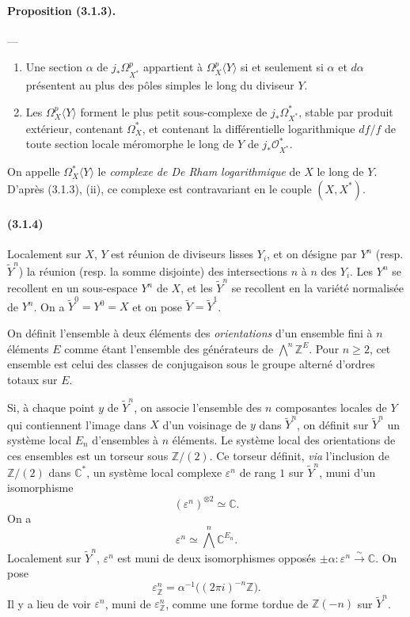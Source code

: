 \documentclass[10pt]{article}
\newcommand{\C}{\mathbb C}
\newcommand{\Z}{\mathbb Z}
\newcommand{\iso}{\xrightarrow{\sim}}
\providecommand{\cO}{\mathcal O}
\providecommand{\cO}{\mathcal O}
\begin{document}
\paragraph{Proposition (3.1.3).} --- {\itshape
\begin{enumerate}[label=(\roman*)]
\item Une section $\alpha$ de $j_*\Omega_{X^*}^p$ appartient à $\Omega_X^p\langle Y\rangle$ si et seulement si $\alpha$ et $d\alpha$ présentent au plus des pôles simples le long du diviseur $Y$.
\item Les $\Omega_X^p\langle Y\rangle$ forment le plus petit sous-complexe de $j_*\Omega_{X^*}^*$, stable par produit extérieur, contenant $\Omega_X^*$, et contenant la différentielle logarithmique $df/f$ de toute section locale méromorphe le long de $Y$ de $j_*\cO_{X^*}^*$.
\end{enumerate}}
On appelle $\Omega_X^*\langle Y\rangle$ le \emph{complexe de De Rham logarithmique} de $X$ le long de $Y$. D'après (3.1.3), (ii), ce complexe est contravariant en le couple $(X,X^*)$.

\paragraph{(3.1.4)} Localement sur $X$, $Y$ est réunion de diviseurs lisses $Y_i$, et on désigne par $Y^n$ (resp. $\widetilde Y^n$) la réunion (resp. la somme disjointe) des intersections $n$ à $n$ des $Y_i$. Les $Y^n$ se recollent en un sous-espace $Y^n$ de $X$, et les $\widetilde Y^n$ se recollent en la variété normalisée de $Y^n$. On a $\widetilde Y^0=Y^0=X$ et on pose $\widetilde Y=\widetilde Y^1$.

On définit l'ensemble à deux éléments des \emph{orientations} d'un ensemble fini à $n$ éléments $E$ comme étant l'ensemble des générateurs de $\bigwedge^n\Z^E$. Pour $n\ge2$, cet ensemble est celui des classes de conjugaison sous le groupe alterné d'ordres totaux sur $E$.

Si, à chaque point $y$ de $\widetilde Y^n$, on associe l'ensemble des $n$ composantes locales de $Y$ qui contiennent l'image dans $X$ d'un voisinage de $y$ dans $\widetilde Y^n$, on définit sur $\widetilde Y^n$ un système local $E_n$ d'ensembles à $n$ éléments. Le système local des orientations de ces ensembles est un torseur sous $\Z/(2)$. Ce torseur définit, \emph{via} l'inclusion de $\Z/(2)$ dans $\C^*$, un système local complexe $\varepsilon^n$ de rang $1$ sur $\widetilde Y^n$, muni d'un isomorphisme
\[
(\varepsilon^n)^{\otimes2}\simeq\C.
\]
On a
\[
\varepsilon^n\simeq\bigwedge^n\C^{E_n}.
\]
Localement sur $\widetilde Y^n$, $\varepsilon^n$ est muni de deux isomorphismes opposés $\pm\alpha:\varepsilon^n\iso\C$. On pose
\[
\varepsilon_\Z^n=\alpha^{-1}\bigl((2\pi i)^{-n}\Z\bigr).
\]
Il y a lieu de voir $\varepsilon^n$, muni de $\varepsilon_\Z^n$, comme une forme tordue de $\Z(-n)$ sur $\widetilde Y^n$.
\end{document}
